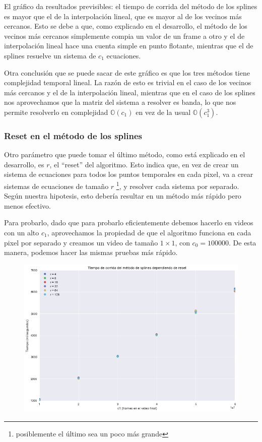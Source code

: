 El gr\'afico da resultados previsibles: el tiempo de corrida del m\'etodo de los
splines es mayor que el de la interpolaci\'on lineal, que es mayor al de los
vecinos m\'as cercanos. Esto se debe a que, como explicado en el desarrollo,
el m\'etodo de los vecinos m\'as cercanos simplemente compia un valor de un
frame a otro y el de interpolaci\'on lineal hace una cuenta simple en punto
flotante, mientras que el de splines resuelve un sistema de $c_1$ ecuaciones.

Otra conclusi\'on que se puede sacar de este gr\'afico es que los tres m\'etodos
tiene complejidad temporal lineal. La raz\'on de esto es trivial en el caso de los
vecinos m\'as cercanos y el de la interpolaci\'on lineal, mientras que en el
caso de los splines nos aprovechamos que la matriz del sistema a resolver es
banda, lo que nos permite resolverlo en complejidad $\mathbb{O}(c_1)$ en vez de
la usual $\mathbb{O}(c_1^3)$.

\subsubsection{Reset en el m\'etodo de los splines}

Otro par\'ametro que puede tomar el \'ultimo m\'etodo, como est\'a explicado en
el desarrollo, es $r$, el ``reset'' del algoritmo. Esto indica que, en vez de
crear un sistema de ecuaciones para todos los puntos temporales en cada pixel,
va a crear sistemas de ecuaciones de tama\~no $r$ \footnote{posiblemente el
\'ultimo sea un poco m\'as grande}, y resolver cada sistema por separado.
Seg\'un nuestra hipotesis, esto deber\'ia resultar en un m\'etodo m\'as r\'apido
pero menos efectivo.

Para probarlo, dado que para probarlo eficientemente debemos hacerlo en videos
con un alto $c_1$, aprovechamos la propiedad de que el algoritmo funciona en
cada pixel por separado y creamos un video de tama\~no $1 \times 1$, con $c_0 =
100000$. De esta manera, podemos hacer las mismas pruebas m\'as r\'apido.

\begin{figure}[H]
\centering
\includegraphics[width=.95\textwidth]{graficos/tiempo_reset.png}
\end{figure}

